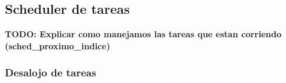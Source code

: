 \subsection{Scheduler de tareas}

\begin{comment}
4.7.
Ejercicio 7

a) Construir una función para inicializar las estructuras de datos del scheduler.


b) Crear la función sched proximo indice() que devuelve el ındice en la GDT de la próxima
tarea a ser ejecutada. Construir la rutina de forma devuelva una tarea de cada jugador
por vez según se explica en la sección 3.2

c) Modificar la rutina de la interrupción 0x66, para que implemente los tres servicios según
se indica en la sección 3.1.1.


d) Modificar el código necesario para que se realice el intercambio de tareas por cada ciclo de
reloj. El intercambio se realizará según indique la función sched proximo indice().


e) Modificar las rutinas de excepciones del procesador para que desalojen y destruyan a la
tarea que estaba corriendo y corran la próxima.


f) Implementar el mecanismo de debugging explicado en la sección 3.4 que indicará en pan-
talla la razón del desalojo de una tarea.


Nota: Se recomienda construir funciones en C que ayuden a resolver problemas como
convertir direcciones de el mapa a direcciones fısicas o buscar la proxima tarea a ejecutar.

\end{comment}


{\LARGE \textbf{TODO: Explicar como manejamos las tareas que estan corriendo (sched\_proximo\_indice)}}


\subsubsection{Desalojo de tareas}
\label{sec-desalojo}

